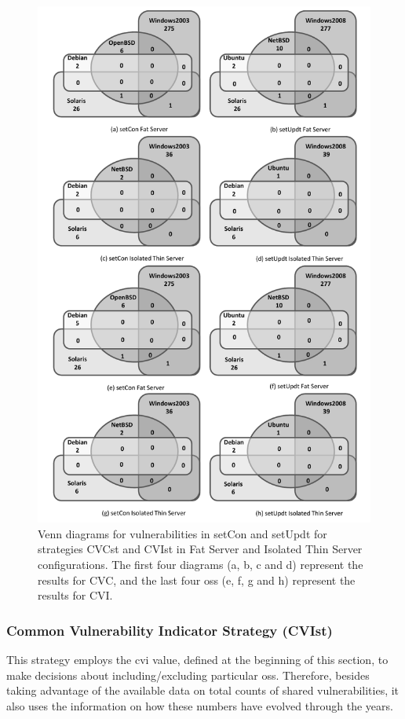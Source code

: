 \begin{figure}[!ht]
 \centering
 \includegraphics[scale=0.55]{images/images/grayscale_ven_dia_one_fig_update.pdf}
 \caption{Venn diagrams for vulnerabilities in setCon and setUpdt for strategies CVCst and CVIst in Fat Server and Isolated Thin Server configurations. The first four diagrams (a, b, c and d) represent the results for CVC, and the last four \glspl{os} (e, f, g and h) represent the results for CVI.}
 \label{fig-venn}
\end{figure}


\subsubsection*{Common Vulnerability Indicator Strategy (CVIst)} 
This strategy employs the \gls{cvi} value, defined at the beginning of this section, to make decisions about including/excluding particular \glspl{os}.
Therefore, besides taking advantage of the available data on total counts of shared vulnerabilities, it also uses the information on how these numbers have evolved through the years.

